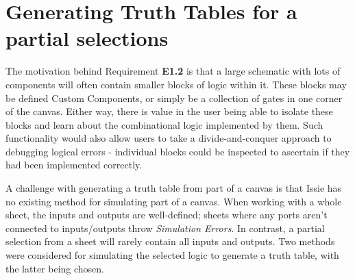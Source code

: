 \section{Generating Truth Tables for a partial selections}
The motivation behind Requirement \textbf{E1.2} is that a large schematic with lots of components will often contain smaller blocks of logic within it. These blocks may be defined Custom Components, or simply be a collection of gates in one corner of the canvas. Either way, there is value in the user being able to isolate these blocks and learn about the combinational logic implemented by them. Such functionality would also allow users to take a divide-and-conquer approach to debugging logical errors - individual blocks could be inspected to ascertain if they had been implemented correctly. 

A challenge with generating a truth table from part of a canvas is that Issie has no existing method for simulating part of a canvas. When working with a whole sheet, the inputs and outputs are well-defined; sheets where any ports aren't connected to inputs/outputs throw \textit{Simulation Errors}. In contrast, a partial selection from a sheet will rarely contain all inputs and outputs. Two methods were considered for simulating the selected logic to generate a truth table, with the latter being chosen.
